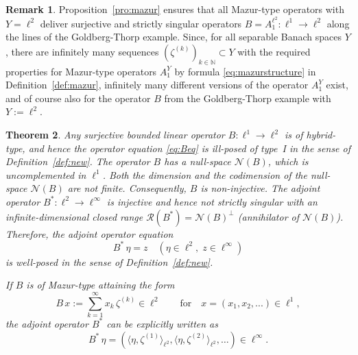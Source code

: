 \documentclass[12pt,twoside,reqno]{amsart}
\newtheorem{theorem}{Theorem}[section]
\theoremstyle{definition}
\newtheorem{remark}[theorem]{Remark}
\numberwithin{equation}{section}
\begin{document}
\begin{remark} \label{rem:l1identity}
Proposition~\ref{pro:mazur} ensures that all Mazur-type operators with $Y=\ell^2$ deliver surjective and strictly singular operators $B=A_1^{\ell^2}: \ell^1 \to \ell^2$ along the lines of
the Goldberg-Thorp example. Since, for all separable Banach spaces $Y$, there are infinitely many sequences $(\zeta^{(k)})_{k\in\mathbb{N}} \subset Y$ with the required properties for Mazur-type operators $A_1^Y$ by formula \eqref{eq:mazurstructure} in Definition~\ref{def:mazur}, infinitely many different versions of the operator $A_1^Y$ exist, and of course also for the operator $B$ from the Goldberg-Thorp example with $Y:=\ell^2$.
\end{remark}

\pagebreak

\begin{theorem} \label{thm:Bprop}
Any surjective bounded linear operator $B: \ell^1 \to \ell^2$ is of hybrid-type, and hence the operator equation \eqref{eq:Beq} is ill-posed of type~I in the sense of Definition~\ref{def:new}.
The operator $B$ has a null-space $\mathcal{N}(B)$, which is uncomplemented in $\ell^1$. Both the dimension and the codimension of the null-space $\mathcal{N}(B)$ are not finite. Consequently,  $B$ is non-injective. The adjoint operator $B^*: \ell^2 \to \ell^\infty$ is injective and hence not strictly singular with an infinite-dimensional closed range $\mathcal{R}(B^*)=\mathcal{N}(B)^\perp$ (annihilator of $\mathcal{N}(B)$). Therefore, the adjoint operator equation
\begin{equation}\label{eq:Beq*}
B^*\,\eta  =z  \quad (\eta \in \ell^2,\; z \in \ell^\infty)
\end{equation}
is well-posed in the sense of Definition~\ref{def:new}.

If $B$ is of Mazur-type attaining the form
\begin{equation}\label{eq:Bstructure}
B\,x:=\sum_{k=1}^\infty x_k\,\zeta^{(k)} \in \ell^2 \qquad \mbox{for} \quad x=(x_1,x_2,...) \in \ell^1,
\end{equation}
the adjoint operator $B^*$ can be explicitly written as
\begin{equation}\label{eq:B*}
B^*\,\eta= (\langle\eta,\zeta^{(1)}\rangle_{\ell^2},\langle\eta,\zeta^{(2)}\rangle_{\ell^2},\ldots)   \in \ell^\infty.
\end{equation}
\end{theorem}
\end{document}
